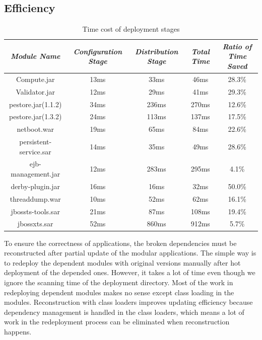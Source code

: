 \documentclass[conference]{IEEEtran}
\begin{document}
\subsection{Efficiency}


\begin{table}
\centering
\caption{Time cost of deployment stages}
\label{tab:stage}
\begin{tabular}{|c|c|c|c|c|}
\hline
\emph{Module Name}	&	\emph{Configuration Stage}	&	\emph{Distribution Stage}	&	\emph{Total Time}	&	\emph{Ratio of Time Saved}\\
\hline
\hline
Compute.jar		&	13ms			&	33ms			&	46ms			&	28.3\%\\
\hline
Validator.jar		&	12ms			&	29ms			&	41ms			&	29.3\%\\
\hline
pestore.jar(1.1.2)	&	34ms			&	236ms			&	270ms			&	12.6\%\\
\hline
pestore.jar(1.3.2)	&	24ms			&	113ms			&	137ms			&	17.5\%\\
\hline
netboot.war		&	19ms		 	&	65ms			&	84ms			&	22.6\%\\
\hline
persistent-service.sar 	& 	14ms 			&	35ms			&	49ms			&	28.6\%\\
\hline
ejb-management.jar	& 	12ms		 	&	283ms			&	295ms			&	4.1\%\\
\hline
derby-plugin.jar	&	16ms			&	16ms			&	32ms			&	50.0\%\\
\hline
threaddump.war		&	10ms			&	52ms			&	62ms			&	16.1\%\\
\hline
jbossts-tools.sar	&	21ms			&	87ms			&	108ms			&	19.4\%\\
\hline
jbossxts.sar		&	52ms			&	860ms			&	912ms			&	5.7\%\\
\hline
\end{tabular}
\end{table}

To ensure the correctness of applications, the broken dependencies must be reconstructed after partial update of the modular applications.
The simple way is to redeploy the dependent modules with original versions manually after hot deployment of the depended ones.
However, it takes a lot of time even though we ignore the scanning time of the deployment directory.
Most of the work in redeploying dependent modules makes no sense except class loading in the modules.
Reconstruction with class loaders improves updating efficiency because dependency management is handled in the class loaders, which means a lot of work in the redeployment process can be eliminated when reconstruction happens.
\end{document}

